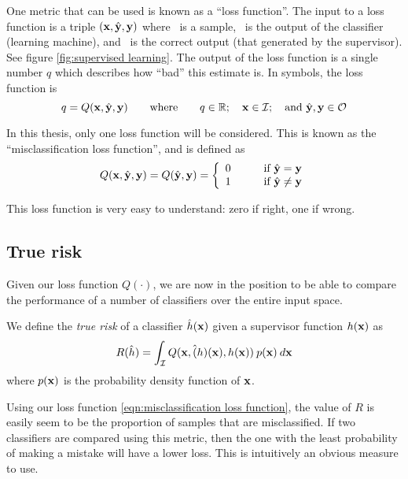 One metric that can be used is known as a ``loss function''.  The
input to a loss function is a triple $(\mathbf{x}, \hat{\mathbf{y}}, \mathbf{y})$ where \bfx\
is a sample, \bfyh\ is the output of the classifier (learning
machine), and \bfy\ is the correct output (that generated by the
supervisor).  See figure \ref{fig:supervised learning}.  The output of
the loss function is a single number $q$ which describes how ``bad''
this estimate is.  In symbols, the loss function is
%
\begin{equation}
q = Q(\mathbf{x}, \hat{\mathbf{y}}, \mathbf{y}) \qquad \mbox{where} \qquad q \in \mathbb{R}; \quad
\mathbf{x} \in \mathcal{I}; \quad \mbox{and }\hat{\mathbf{y}}, \mathbf{y} \in \mathcal{O}
\end{equation}

In this thesis, only one loss function will be considered.  This is
known as the ``misclassification loss function'', and is defined as
%
\begin{equation}
Q(\mathbf{x}, \hat{\mathbf{y}}, \mathbf{y}) = Q(\hat{\mathbf{y}}, \mathbf{y}) = \left\{
\begin{array}{ll}
	0	&	\qquad \mbox{if $\hat{\mathbf{y}} = \mathbf{y}$} \\
	1	&	\qquad \mbox{if $\hat{\mathbf{y}} \neq \mathbf{y}$}
\end{array}
\right.
\label{eqn:misclassification loss function}
\end{equation}

This loss function is very easy to understand: zero if right, one if
wrong.


\subsection{True risk}
\label{sec:true risk}
Given our loss function $Q(\cdot)$, we are now in the position to be
able to compare the performance of a number of classifiers over the
entire input space.

\begin{definition}
We define the \emph{true risk} of a classifier $\hat{h}(\mathbf{x})$ given a
supervisor function $h(\mathbf{x})$ as 
%
\begin{equation}
R(\hat{h}) = \int_{\mathcal{I}} Q(\mathbf{x}, \hat(h)(\mathbf{x}), h(\mathbf{x})) \: p(\mathbf{x}) \: d\mathbf{x}
\label{eqn:true risk}
\end{equation}
%
where $p(\mathbf{x})$ is the probability density function of $\mathbf{x}$.
\end{definition}


Using our loss function \ref{eqn:misclassification loss function}, the
value of $R$ is easily seem to be the proportion of samples that are
misclassified.  If two classifiers are compared using this metric,
then the one with the least probability of making a mistake will have
a lower loss.  This is intuitively an obvious measure to use.

